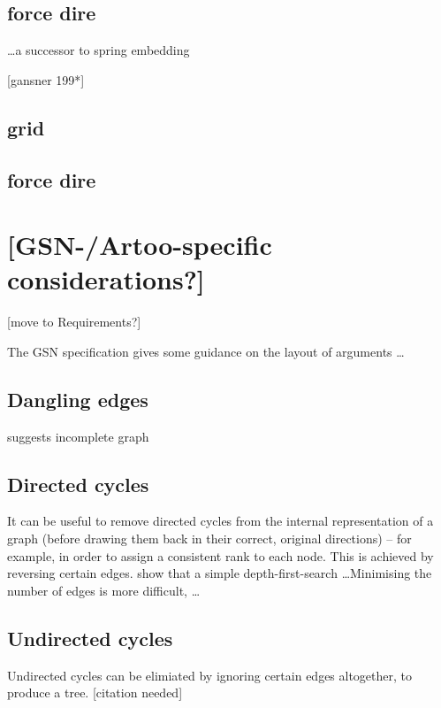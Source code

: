 \documentclass[authoryearcitations]{UoYCSproject}
\begin{document}
\begin{itemize*}
\subsection{force dire}

\ldots a successor to \citet{tutte} spring embedding

[gansner 199*]

\subsection{grid}



\subsection{force dire}

\section{[GSN-/Artoo-specific considerations?]}

[move to Requirements?]

The GSN specification \citep[section~2.2, pp.~26--27]{gsnstandard} gives some guidance on the layout of arguments \ldots



\subsection{Dangling edges}

suggests incomplete graph

\subsection{Directed cycles}

It can be useful to remove directed cycles from the internal representation of a graph
(before drawing them back in their correct, original directions)
-- for example, in order to assign a consistent rank to each node.
This is achieved by reversing certain edges.
\citet{gansner1993} show that a simple depth-first-search \ldots  Minimising the number of edges is more difficult, \citeauthor{gansner1993} \ldots

\subsection{Undirected cycles}

Undirected cycles can be elimiated by ignoring certain edges altogether, to produce a tree.  [citation needed]




\end{itemize*}
\end{document}
